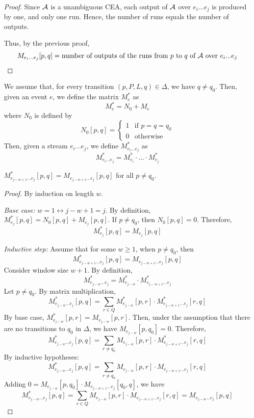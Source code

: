 \begin{proof}
Since $\mathcal{A}$ is a unambiguous CEA, each output of $\mathcal{A}$ over $e_i...e_j$ is produced by one, and only one run. Hence, the number of runs equals the number of outputs.

Thus, by the previous proof, $$M_{e_i...e_j}[p,q] = \text{number of outputs of the runs from $p$ to $q$ of $\mathcal{A}$ over } e_i...e_j$$
\end{proof}

We assume that, for every transition $(p, P, L, q) \in \Delta$, we have $q \neq q_0$. Then, given an event $e$, we define the matrix $M_e^*$ as
$$M_e^* = N_0 + M_e$$
where $N_0$ is defined by
\[
N_0[p,q] = \begin{cases}
    1 & \text{if } p=q = q_0 \\
    0 & \text{otherwise}
\end{cases}
\]
Then, given a stream $e_i...e_j$, we define $M_{e_i...e_j}^*$ as
$$M_{e_i...e_j}^* = M_{e_i}^* \cdot ... \cdot M_{e_j}^*$$

\begin{lemma}\label{lemma:equal_outside_initial}
    $M^*_{e_{j-w+1}\dots e_j}[p,q] = M_{e_{j-w+1}\dots e_j}[p,q]$ for all $p\neq q_0$.
\end{lemma}
\begin{proof}
By induction on length $w$.

\noindent\emph{Base case:} $w = 1 \longleftrightarrow j - w + 1 = j$.
By definition, $M^*_{e_j}[p,q] = N_0[p,q] + M_{e_j}[p,q]$. If $p\neq q_0$, then $N_0[p,q]=0$. Therefore, $$M^*_{e_j}[p,q] = M_{e_j}[p,q]$$

\noindent\emph{Inductive step:} Assume that for some $w\geq 1$, when $p\neq q_0$, then
    \[
    M^*_{e_{j - w + 1}\dots e_j}[p,q] = M_{e_{j - w + 1}\dots e_j}[p,q] 
    \]
Consider window size $w+1$. By definition, $$M^*_{e_{j-w}\dots e_j} = M^*_{e_{j-w}} \cdot M^*_{e_{j-w + 1}\dots e_j} $$
Let $p\neq q_0$. By matrix multiplication, 
$$M^*_{e_{j-w}\dots e_j}[p,q] = \sum_{r\in Q} M^*_{e_{j-w}}[p, r] \cdot M^*_{e_{j-w + 1}\dots e_j}[r, q] $$
By base case, $M^*_{e_{j-w}}[p, r] = M_{e_{j-w}}[p, r]$. Then, under the assumption that there are no transitions to $q_0$ in $\Delta$, we have $M_{e_{j-w}}[p, q_0] = 0$. Therefore,
$$M^*_{e_{j-w}\dots e_j}[p,q] = \sum_{r\neq q_0} M_{e_{j-w}}[p, r] \cdot M^*_{e_{j-w + 1}\dots e_j}[r, q] $$
By inductive hypotheses:
$$M^*_{e_{j-w}\dots e_j}[p,q] = \sum_{r\neq q_0} M_{e_{j-w}}[p, r] \cdot M_{e_{j-w + 1}\dots e_j}[r, q] $$
Adding $0 = M_{e_{j-w}}[p, q_0] \cdot M_{e_{j-w + 1}\dots e_j}[q_0, q]$, we have
$$M^*_{e_{j-w}\dots e_j}[p,q] = \sum_{r \in Q} M_{e_{j-w}}[p,r] \cdot M_{e_{j-w+1}\dots e_j}[r,q] = M_{e_{j-w}\dots e_j}[p,q]$$    
\end{proof}


